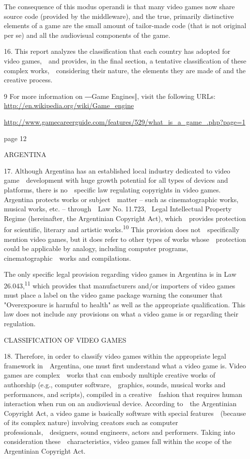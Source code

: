 \documentclass[
]{article}
\begin{document}
{The consequence of this }{modus operandi }{is that many video games now
share source code (provided by the middleware), and the true, primarily
distinctive elements of a game are the small amount of tailor-made code
(that is not original }{per se}{) and all the audiovisual components of
the game.}

{16. }{This report analyzes the classification that each country has
adopted for video games,~~and provides, in the final section, a
tentative classification of these complex works,~~considering their
nature, the elements they are made of and the creative process.}

{9 }{For more information on ―Game Engines‖, visit the following URLs:
}\href{http://en.wikipedia.org/wiki/Game_engine}{{http://en.wikipedia.org/wiki/Game\_engine}}

\href{http://www.gamecareerguide.com/features/529/what_is_a_game_.php?page=1}{{http://www.gamecareerguide.com/features/529/what\_is\_a\_game\_.php?page=1}}

{page 12}

{ARGENTINA}

{17. }{Although Argentina has an established local industry dedicated to
video game~~development with huge growth potential for all types of
devices and platforms, there is no~~specific law regulating copyrights
in video games. Argentina protects works or subject~~matter }{-- }{such
as cinematographic works, musical works, etc. }{-- }{through~~}{Law No.
11.723}{, }{~Legal Intellectual Property Regime }{(hereinafter, the
Argentinian }{Copyright Act)}{, which~~provides protection for
scientific, literary and artistic works.}\textsuperscript{{10 }}{This
provision does not~~specifically mention video games, but it does refer
to other types of works whose~~protection could be applicable by
analogy, including computer programs, cinematographic~~works and
compilations.}

{The only specific legal provision regarding video games in Argentina is
in Law 26.043,}\textsuperscript{{11 }}{which provides that manufacturers
and/or importers of video games must place a label on the video game
package warning the consumer that "}{Overexposure is harmful to
health}{" as well as the appropriate qualification. This law does not
include any provisions on what a video game is or regarding their
regulation.}

{CLASSIFICATION OF VIDEO GAMES}

{18. }{Therefore, in order to classify video games within the
appropriate legal framework in~~Argentina, one must first understand
what a video game is. Video games are complex~~works that can embody
multiple creative works of authorship (e.g., computer
software,~~graphics, sounds, musical works and performances, and
scripts), compiled in a creative~~fashion that requires human
interaction when run on an audiovisual device. According to~~the
Argentinian }{Copyright Act}{, a video game is basically software with
special features~~(because of its complex nature) involving creators
such as computer professionals,~~designers, sound engineers, actors and
performers. Taking into consideration these~~characteristics, video
games fall within the scope of the Argentinian }{Copyright Act}{.}
\end{document}
